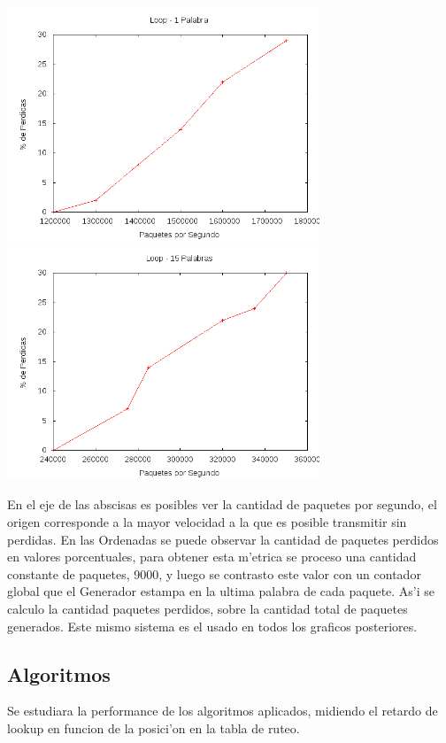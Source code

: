 \documentclass[12pt,spanish]{article}
\begin{document}
\begin{center}
	\includegraphics[width=0.70\textwidth]{graf/loop1p.png}
	\includegraphics[width=0.70\textwidth]{graf/loop15p.png}
\end{center}

En el eje de las abscisas es posibles ver la cantidad de paquetes por segundo, el origen corresponde a la mayor velocidad a la que es posible transmitir sin perdidas. En las Ordenadas se puede observar la cantidad de paquetes perdidos en valores porcentuales, para obtener esta m'etrica se proceso una cantidad constante de paquetes, 9000, y luego se contrasto este valor con un contador global que el Generador estampa en la ultima palabra de cada paquete. As'i se calculo la cantidad paquetes perdidos, sobre la cantidad total de paquetes generados. Este mismo sistema es el usado en todos los graficos posteriores.

\subsection*{Algoritmos}

Se estudiara la performance de los algoritmos aplicados, midiendo el retardo de lookup en funcion de la posici'on en la tabla
de ruteo.
\end{document}
